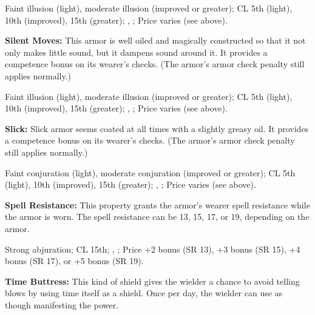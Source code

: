 Faint illusion (light), moderate illusion (improved or greater); CL 5th (light), 10th (improved), 15th (greater); , ; Price varies (see above).

\textbf{Silent Moves:} This armor is well oiled and magically constructed so that it not only makes little sound, but it dampens sound around it. It provides a competence bonus on its wearer's  checks. (The armor's armor check penalty still applies normally.)


Faint illusion (light), moderate illusion (improved or greater); CL 5th (light), 10th (improved), 15th (greater); , ; Price varies (see above).

\textbf{Slick:} Slick armor seems coated at all times with a slightly greasy oil. It provides a competence bonus on its wearer's  checks. (The armor's armor check penalty still applies normally.)


Faint conjuration (light), moderate conjuration (improved or greater); CL 5th (light), 10th (improved), 15th (greater); , ; Price varies (see above).

\textbf{Spell Resistance:} This property grants the armor's wearer spell resistance while the armor is worn. The spell resistance can be 13, 15, 17, or 19, depending on the armor.

Strong abjuration; CL 15th; , ; Price +2 bonus (SR 13), +3 bonus (SR 15), +4 bonus (SR 17), or +5 bonus (SR 19).

\textbf{Time Buttress:} This kind of shield gives the wielder a chance to avoid telling blows by using time itself as a shield. Once per day, the wielder can use  as though manifesting the power.

